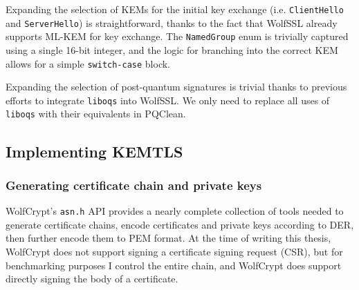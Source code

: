\documentclass[letterpaper,12pt,titlepage,oneside,final]{book}
\begin{document}
Expanding the selection of KEMs for the initial key exchange (i.e. \texttt{ClientHello} and \texttt{ServerHello}) is straightforward, thanks to the fact that WolfSSL already supports ML-KEM for key exchange. The \texttt{NamedGroup} enum is trivially captured using a single 16-bit integer, and the logic for branching into the correct KEM allows for a simple \texttt{switch-case} block.



Expanding the selection of post-quantum signatures is trivial thanks to previous efforts to integrate \texttt{liboqs} into WolfSSL. We only need to replace all uses of \texttt{liboqs} with their equivalents in PQClean.

\subsection{Implementing KEMTLS}\label{sec:implementing-kemtls}
\subsubsection{Generating certificate chain and private keys}
WolfCrypt's \texttt{asn.h} API provides a nearly complete collection of tools needed to generate certificate chains, encode certificates and private keys according to DER, then further encode them to PEM format. At the time of writing this thesis, WolfCrypt does not support signing a certificate signing request (CSR), but for benchmarking purposes I control the entire chain, and WolfCrypt does support directly signing the body of a certificate.
\end{document}
